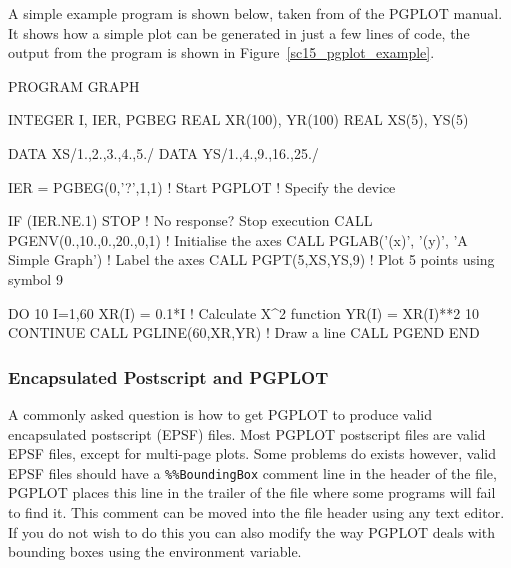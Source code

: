 \documentclass[twoside,11pt]{starlink}
\begin{document}
A simple example program is shown below, taken from
of the PGPLOT manual. It shows how a simple plot can be generated in
just a few lines of code, the output from the program is shown in
Figure~\ref{sc15_pgplot_example}.

\begin{small}
\begin{terminalv}
      PROGRAM GRAPH

      INTEGER I, IER, PGBEG
      REAL XR(100), YR(100)
      REAL XS(5), YS(5)

      DATA XS/1.,2.,3.,4.,5./
      DATA YS/1.,4.,9.,16.,25./

      IER = PGBEG(0,'?',1,1)                     ! Start PGPLOT
                                                 ! Specify the device

      IF (IER.NE.1) STOP                         ! No response? Stop execution
      CALL PGENV(0.,10.,0.,20.,0,1)              ! Initialise the axes
      CALL PGLAB('(x)', '(y)', 'A Simple Graph') ! Label the axes
      CALL PGPT(5,XS,YS,9)                       ! Plot 5 points using symbol 9

      DO 10 I=1,60
          XR(I) = 0.1*I                          ! Calculate X^2 function
          YR(I) = XR(I)**2
   10 CONTINUE
      CALL PGLINE(60,XR,YR)                      ! Draw a line
      CALL PGEND
      END
\end{terminalv}
\end{small}


\subsubsection{Encapsulated Postscript and PGPLOT}

A commonly asked question is how to get PGPLOT to produce valid
encapsulated postscript (EPSF) files. Most PGPLOT postscript files are
valid EPSF files, except for multi-page plots. Some problems do exists
however, valid EPSF files should have a \texttt{\%\%BoundingBox} comment
line in the header of the file, PGPLOT places this line in the trailer
of the file where some programs will fail to find it. This comment can
be moved into the file header using any text editor. If you do not
wish to do this you can also modify the way PGPLOT deals with bounding
boxes using the  environment variable.
\end{document}
